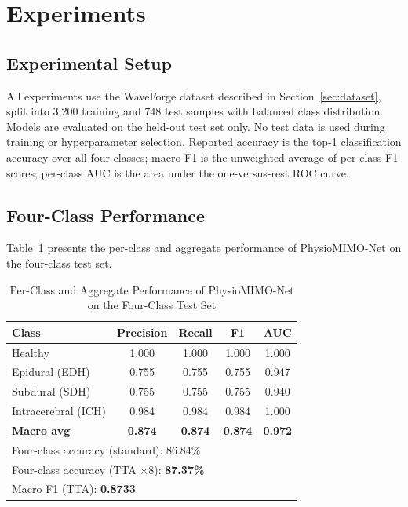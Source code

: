 \documentclass[journal]{IEEEtran}
\begin{document}
\section{Experiments}
\label{sec:experiments}

\subsection{Experimental Setup}

All experiments use the WaveForge dataset described in
Section~\ref{sec:dataset}, split into 3{,}200 training and
748 test samples with balanced class distribution.  Models are
evaluated on the held-out test set only.  No test data is
used during training or hyperparameter selection.  Reported
accuracy is the top-1 classification accuracy over all
four classes; macro F1 is the unweighted average of
per-class F1 scores; per-class AUC is the area under the
one-versus-rest ROC curve.

\subsection{Four-Class Performance}

Table~\ref{tab:perclass} presents the per-class and aggregate
performance of PhysioMIMO-Net on the four-class test set.

\begin{table}[!t]
\caption{Per-Class and Aggregate Performance of
  PhysioMIMO-Net on the Four-Class Test Set}
\label{tab:perclass}
\centering
\begin{tabular}{lcccc}
\toprule
Class & Precision & Recall & F1 & AUC \\
\midrule
Healthy        & 1.000 & 1.000 & 1.000 & 1.000 \\
Epidural (EDH) & 0.755 & 0.755 & 0.755 & 0.947 \\
Subdural (SDH) & 0.755 & 0.755 & 0.755 & 0.940 \\
Intracerebral (ICH) & 0.984 & 0.984 & 0.984 & 1.000 \\
\midrule
\textbf{Macro avg} & \textbf{0.874} & \textbf{0.874}
  & \textbf{0.874} & \textbf{0.972} \\
\midrule
\multicolumn{5}{l}{Four-class accuracy (standard): 86.84\%} \\
\multicolumn{5}{l}{Four-class accuracy (TTA $\times$8): \textbf{87.37\%}} \\
\multicolumn{5}{l}{Macro F1 (TTA): \textbf{0.8733}} \\
\bottomrule
\end{tabular}
\end{table}
\end{document}
